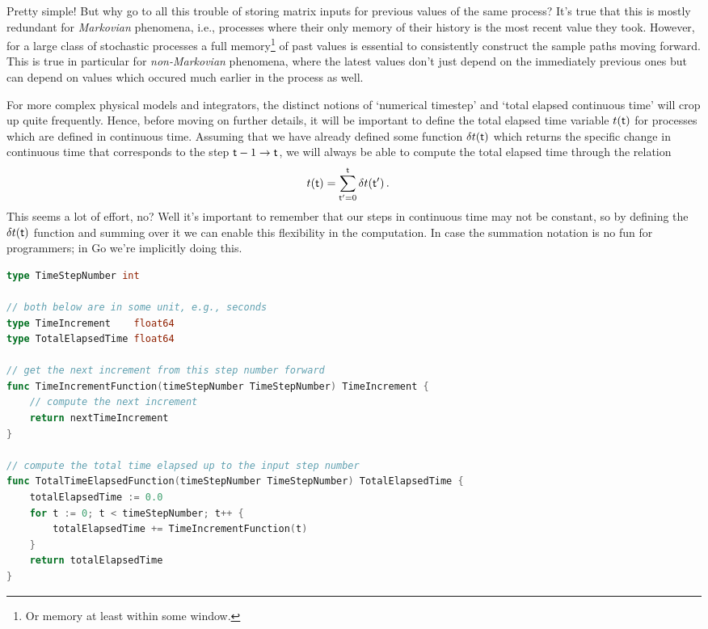 \documentclass{book}
\begin{document}
Pretty simple! But why go to all this trouble of storing matrix inputs for previous values of the same process? It's true that this is mostly redundant for \emph{Markovian} phenomena, i.e., processes where their only memory of their history is the most recent value they took. However, for a large class of stochastic processes a full memory\footnote{Or memory at least within some window.} of past values is essential to consistently construct the sample paths moving forward. This is true in particular for \emph{non-Markovian} phenomena, where the latest values don't just depend on the immediately previous ones but can depend on values which occured much earlier in the process as well.

For more complex physical models and integrators, the distinct notions of `numerical timestep' and `total elapsed continuous time' will crop up quite frequently. Hence, before moving on further details, it will be important to define the total elapsed time variable $t({\sf t})$ for processes which are defined in continuous time. Assuming that we have already defined some function $\delta t({\sf t})$ which returns the specific change in continuous time that corresponds to the step ${\sf t}-1 \rightarrow {\sf t}$, we will always be able to compute the total elapsed time through the relation
\begin{align}
t({\sf t}) &= \sum^{{\sf t}}_{{\sf t}'=0}\delta t({\sf t}') \label{eq:t-steps-sum} \,.
\end{align}
This seems a lot of effort, no? Well it's important to remember that our steps in continuous time may not be constant, so by defining the $\delta t({\sf t})$ function and summing over it we can enable this flexibility in the computation. In case the summation notation is no fun for programmers; in Go we're implicitly doing this.

\begin{lstlisting}[language=Go]
type TimeStepNumber int

// both below are in some unit, e.g., seconds
type TimeIncrement    float64
type TotalElapsedTime float64

// get the next increment from this step number forward
func TimeIncrementFunction(timeStepNumber TimeStepNumber) TimeIncrement {
    // compute the next increment
    return nextTimeIncrement
}

// compute the total time elapsed up to the input step number
func TotalTimeElapsedFunction(timeStepNumber TimeStepNumber) TotalElapsedTime {
    totalElapsedTime := 0.0
    for t := 0; t < timeStepNumber; t++ {
        totalElapsedTime += TimeIncrementFunction(t)
    }
    return totalElapsedTime
}
\end{lstlisting}
\end{document}
